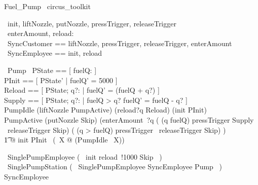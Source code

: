 \documentclass{article}
\begin{document}
\begin{zsection}
\SECTION Fuel\_Pump \parents\ circus\_toolkit
\end{zsection}

\begin{circus}
	\circchannel\ init, liftNozzle, putNozzle, pressTrigger, releaseTrigger\\
	\circchannel\ enterAmount, reload: \nat\\
	\circchannelset\ SyncCustomer == \lchanset liftNozzle, pressTrigger, releaseTrigger, enterAmount \rchanset\\
	\circchannelset\ SyncEmployee == \lchanset init, reload \rchanset\\
\end{circus}

\begin{circus}
\circprocess\ Pump \circdef \circbegin
\also %
    \circstate\ PState == [ fuelQ: \nat ] \\
    PInit == [ PState' | fuelQ' = 5000 ] \\
	Reload == [ \Delta PState; q?: \nat | fuelQ' = (fuelQ + q?) ] \\
	Supply == [ \Delta PState; q?: \nat | fuelQ > q? \land fuelQ' = fuelQ - q? ] \\
	PumpIdle \circdef (liftNozzle \then PumpActive)
        \extchoice 
		(reload?q \then Reload)
		\extchoice
		(init \then PInit)\\
	PumpActive \circdef (putNozzle \then Skip)
		\extchoice
		(enterAmount~?q \then 
		( \lcircguard (q \leq fuelQ) \rcircguard \circguard pressTrigger \then Supply \circseq\ releaseTrigger \then Skip)
		\extchoice
		( \lcircguard (q > fuelQ) \rcircguard \circguard pressTrigger \circseq\ releaseTrigger \then Skip)
		)
		\\
	\t1 @ init \then PInit \circseq\ (\circmu\ X @ (PumpIdle \circseq\ X)) \\
	\circend
\end{circus}

\begin{circus}
\circprocess\ SinglePumpEmployee \circdef (~ init \then reload~!1000 \then Skip ~) \\
\circprocess\ SinglePumpStation \circdef (~ SinglePumpEmployee \lpar SyncEmployee \rpar Pump ~)  \circhide SyncEmployee 
\end{circus}
\end{document}
